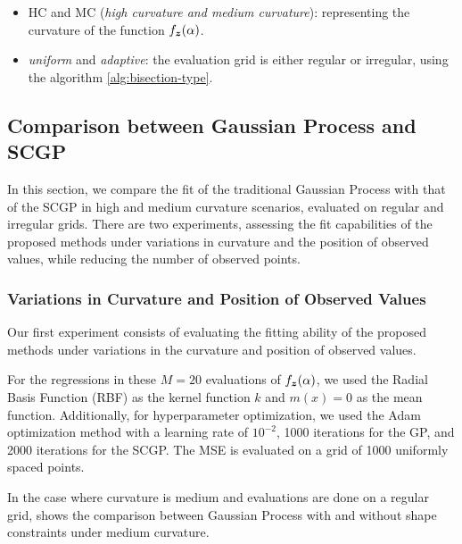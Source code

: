 \begin{itemize}
    \item HC and MC (\textit{high curvature and medium curvature}): representing the curvature of the function \( f_{\boldsymbol{z}}(\alpha) \).
    \item \textit{uniform} and \textit{adaptive}: the evaluation grid is either regular or irregular, using the algorithm \ref{alg:bisection-type}.
\end{itemize}

\subsection{Comparison between Gaussian Process and SCGP}

In this section, we compare the fit of the traditional Gaussian Process with that of the SCGP in high and medium curvature scenarios, evaluated on regular and irregular grids.
There are two experiments, assessing the fit capabilities of the proposed methods under variations in curvature and the position of observed values, while reducing the number of observed points.

\subsubsection{Variations in Curvature and Position of Observed Values}
\label{sec:curvature}

Our first experiment consists of evaluating the fitting ability of the proposed methods under variations in the curvature and position of observed values.

For the regressions in these \( M=20 \) evaluations of \( f_{\boldsymbol{z}}(\alpha) \), we used the Radial Basis Function (RBF) as the kernel function \( k \) and \( m(x) = 0 \) as the mean function.
Additionally, for hyperparameter optimization, we used the Adam optimization method \cite{Kingma2017} with a learning rate of \( 10^{-2} \), 1000 iterations for the GP, and 2000 iterations for the SCGP. The MSE is evaluated on a grid of 1000 uniformly spaced points.

In the case where curvature is medium and evaluations are done on a regular grid,  shows the comparison between Gaussian Process with and without shape constraints under medium curvature.

